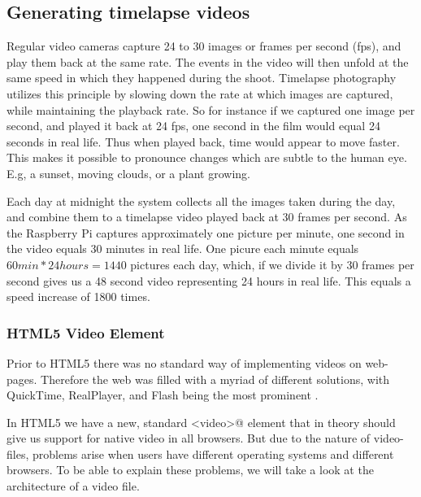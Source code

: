 \subsection{Generating timelapse videos}
Regular video cameras capture 24 to 30 images or frames per second (fps), and play them back at the same rate. The events in the video will then unfold at the same speed in which they happened during the shoot. Timelapse photography utilizes this principle by slowing down the rate at which images are captured, while maintaining the playback rate. So for instance if we captured one image per second, and played it back at 24 fps, one second in the film would equal 24 seconds in real life. Thus when played back, time would appear to move faster. This makes it possible to pronounce changes which are subtle to the human eye. E.g, a sunset, moving clouds, or a plant growing.  

Each day at midnight the system collects all the images taken during the day, and combine them to a timelapse video played back at 30 frames per second. As the Raspberry Pi captures approximately one picture per minute, one second in the video equals 30 minutes in real life. One picure each minute equals \begin{math} 60min*24hours=1440 \end{math}
pictures each day, which, if we divide it by 30 frames per second gives us a 48 second video representing 24 hours in real life. This equals a speed increase of 1800 times. 


\subsubsection{HTML5 Video Element}
Prior to HTML5 there was no standard way of implementing videos on web-pages. Therefore the web was filled with a myriad of different solutions, with QuickTime, RealPlayer, and Flash being the most prominent \citep{pilgrim2010html5}.

In HTML5 we have a new, standard \verb@<video>@ element that in theory should give us support for native video in all browsers. But due to the nature of video-files, problems arise when users have different operating systems and different browsers. To be able to explain these problems, we will take a look at the architecture of a video file.

